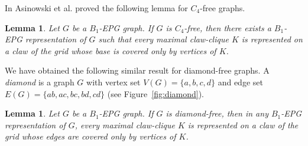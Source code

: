 \documentclass[9pt]{entcs}
\newtheorem{lema}[thm]{Lemma}%
\begin{document}


In \cite{ries2009} Asinowski et al. proved the following lemma for $C_4$-free graphs.

\begin{lema} \cite{ries2009} \label{lem:lemaBRies2009}
Let $G$ be a $B_1$-EPG graph. If $G$ is $C_4$-free, then there exists a $B_1$-EPG representation of $G$ such that every  maximal claw-clique $K$ is represented on a claw of the grid whose base is covered only by vertices of $K$.
\end{lema}


We have obtained the following similar result for diamond-free graphs. A \textit{diamond} is a graph $G$ with vertex set $V(G) = \{a, b, c, d\}$ and edge set $E(G)=\{ab, ac,bc, bd,cd\}$ (see Figure~\ref{fig:diamond}). %



\begin{lema}\label{lem:b1epgDiamondFree}
Let $G$ be a $B_1$-EPG graph. If $G$ is diamond-free, then in any $B_1$-EPG representation of $G$,  every maximal claw-clique $K$ is represented on a claw of the grid whose edges are covered only by vertices of $K$.%

\end{lema}
\end{document}

